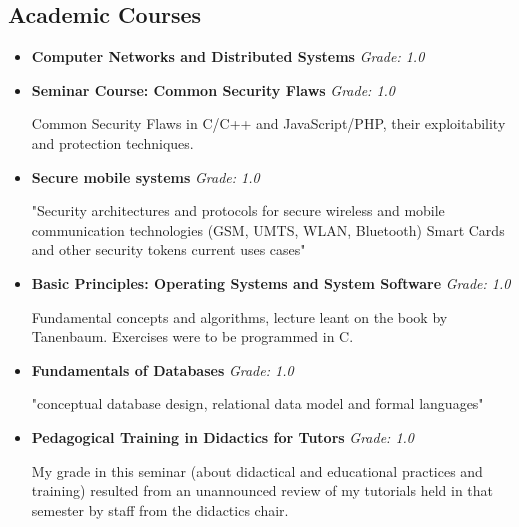 \documentclass[11pt,a4paper,sans]{moderncv}        %
\begin{document}
\vspace{2pt}

\subsection{Academic Courses}

\vspace{5pt}

\begin{itemize}

\item{\textbf{Computer Networks and Distributed Systems} \textit{Grade: 1.0}}

\item{\textbf{Seminar Course: Common Security Flaws} \textit{Grade: 1.0}

\vspace{2pt}
\small{Common Security Flaws in C/C++ and JavaScript/PHP, their exploitability and protection techniques.}}

\vspace{2pt}

\item{\textbf{Secure mobile systems} \textit{Grade: 1.0}

\vspace{2pt}
\small{"Security architectures and protocols for secure wireless and mobile 
communication technologies (GSM, UMTS, WLAN, Bluetooth) Smart Cards and other 
security tokens current uses cases"}}

\vspace{2pt}

\item{\textbf{Basic Principles: Operating Systems and System Software} \textit{Grade: 1.0}

\vspace{2pt}
\small{Fundamental concepts and algorithms, lecture leant on the book by Tanenbaum. Exercises were to be programmed in C.}}

\item{\textbf{Fundamentals of Databases} \textit{Grade: 1.0}

\vspace{2pt}
\small{"conceptual database design, relational data model and formal languages"}}

\item{\textbf{Pedagogical Training in Didactics for Tutors} \textit{Grade: 1.0}

\vspace{2pt}
\small{My grade in this seminar (about didactical and educational practices and training) resulted from an unannounced review of my tutorials held in that semester by staff from the didactics chair.}}


\end{itemize}
\end{document}
